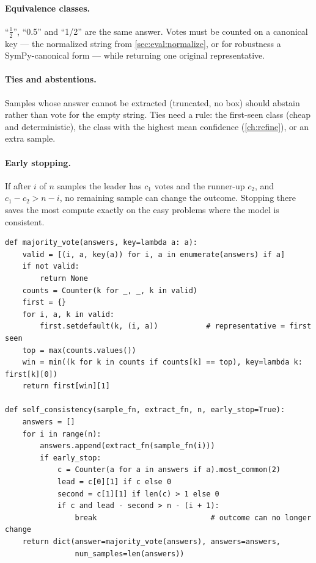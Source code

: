 \paragraph{Equivalence classes.} ``$\frac12$'', ``0.5'' and ``1/2'' are the same answer. Votes must
be counted on a canonical key --- the normalized string from \cref{sec:eval:normalize}, or for
robustness a SymPy-canonical form --- while returning one original representative.

\paragraph{Ties and abstentions.} Samples whose answer cannot be extracted (truncated, no box) should
abstain rather than vote for the empty string. Ties need a rule: the first-seen class (cheap and
deterministic), the class with the highest mean confidence (\cref{ch:refine}), or an extra sample.

\paragraph{Early stopping.} If after $i$ of $n$ samples the leader has $c_1$ votes and the runner-up
$c_2$, and $c_1 - c_2 > n - i$, no remaining sample can change the outcome. Stopping there saves the
most compute exactly on the easy problems where the model is consistent.

\begin{lstlisting}[caption={Majority vote with equivalence keys, tie-breaking and early stopping (condensed from \texttt{llmsys/tts.py}).},label={lst:scaling:sc}]
def majority_vote(answers, key=lambda a: a):
    valid = [(i, a, key(a)) for i, a in enumerate(answers) if a]
    if not valid:
        return None
    counts = Counter(k for _, _, k in valid)
    first = {}
    for i, a, k in valid:
        first.setdefault(k, (i, a))           # representative = first seen
    top = max(counts.values())
    win = min((k for k in counts if counts[k] == top), key=lambda k: first[k][0])
    return first[win][1]

def self_consistency(sample_fn, extract_fn, n, early_stop=True):
    answers = []
    for i in range(n):
        answers.append(extract_fn(sample_fn(i)))
        if early_stop:
            c = Counter(a for a in answers if a).most_common(2)
            lead = c[0][1] if c else 0
            second = c[1][1] if len(c) > 1 else 0
            if c and lead - second > n - (i + 1):
                break                          # outcome can no longer change
    return dict(answer=majority_vote(answers), answers=answers,
                num_samples=len(answers))
\end{lstlisting}


